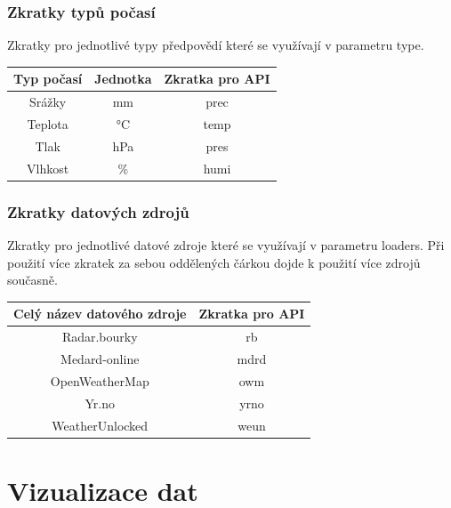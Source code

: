 \documentclass[czech,bachelor,dept460,male,csharp,cpdeclaration]{diploma}
\begin{document}
	\subsubsection{Zkratky typů počasí}
	
	Zkratky pro jednotlivé typy předpovědí které se využívají v parametru type.
	
	\begin{center}
		\begin{tabular}{c c c}
			Typ počasí & Jednotka & Zkratka pro API\\
			\midrule
			Srážky & mm & prec \\
			Teplota & °C & temp \\
			Tlak & hPa & pres \\
			Vlhkost & \% & humi \\
		\end{tabular}
	\end{center}
	
	\subsubsection{Zkratky datových zdrojů}
	
	Zkratky pro jednotlivé datové zdroje které se využívají v parametru loaders. Při použití více zkratek za sebou oddělených čárkou dojde k použití více zdrojů současně.
	
	\begin{center}
		\begin{tabular}{c c}
			Celý název datového zdroje & Zkratka pro API\\
			\midrule
			Radar.bourky & rb \\
			Medard-online & mdrd \\
			OpenWeatherMap & owm \\
			Yr.no & yrno \\
			WeatherUnlocked & weun \\
		\end{tabular}
	\end{center}
	
	\section{Vizualizace dat}
	
	
	
\end{document}
